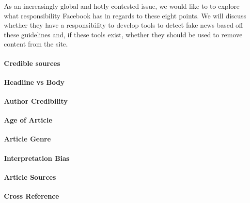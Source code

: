 \documentclass[11pt]{article}
\begin{document}
As an increasingly global and hotly contested issue, we would like to to explore what responsibility Facebook has in regards to these eight points. We will discuss whether they have a responsibility to develop tools to detect fake news based off these guidelines and, if these tools exist, whether they should be used to remove content from the site.


\paragraph{Credible sources}
\paragraph{Headline vs Body}
\paragraph{Author Credibility}
\paragraph{Age of Article}
\paragraph{Article Genre}
\paragraph{Interpretation Bias}
\paragraph{Article Sources}
\paragraph{Cross Reference}




\end{document}
